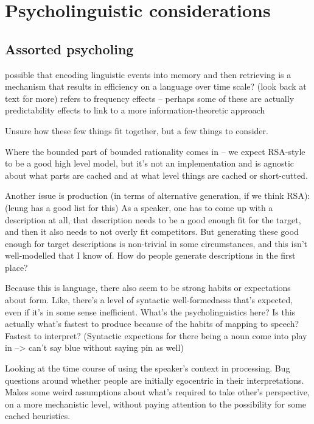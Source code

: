 \documentclass[]{article}
\begin{document}
\section{Psycholinguistic considerations}

\subsection{Assorted psycholing}
\cite{bybee2006} possible that encoding linguistic events into memory and then retrieving is a mechanism that results in efficiency on a language over time scale? (look back at text for more) 
refers to frequency effects -- perhaps some of these are actually predictability effects to link to a more information-theoretic approach 

Unsure how these few things fit together, but a few things to consider.

Where the bounded part of bounded rationality comes in -- we expect RSA-style to be a good high level model, but it's not an implementation and is agnostic about what parts are cached and at what level things are cached or short-cutted. 

Another issue is production (in terms of alternative generation, if we think RSA): (leung has a good list for this) As a speaker, one has to come up with a description at all, that description needs to be a good enough fit for the target, and then it also needs to not overly fit competitors. But generating these good enough for target descriptions is non-trivial in some circumstances, and this isn't well-modelled that I know of. How do people generate descriptions in the first place? 

Because this is language, there also seem to be strong habits or expectations about form. Like, there's a level of syntactic well-formedness that's expected, even if it's in some sense inefficient. What's the psycholinguistics here? Is this actually what's fastest to produce because of the habits of mapping to speech? Fastest to interpret? (Syntactic expections for there being a noun come into play in \cite{degen20200406} --> can't say blue without saying pin as well) 

\cite{hanna2003} Looking at the time course of using the speaker's context in processing. Bug questions around whether people are initially egocentric in their interpretations. Makes some weird assumptions about what's required to take other's perspective, on a more mechanistic level, without paying attention to the possibility for some cached heuristics. 
\end{document}
